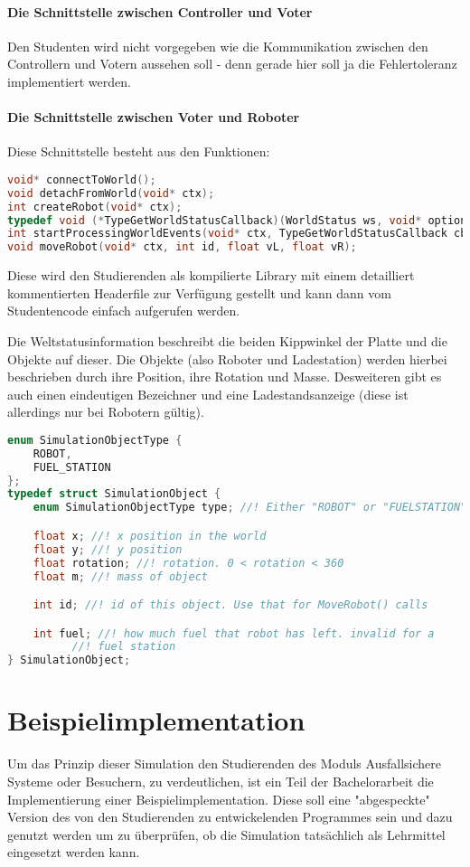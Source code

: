 \paragraph{Die Schnittstelle zwischen Controller und Voter} Den Studenten wird nicht vorgegeben wie die Kommunikation zwischen den Controllern und Votern aussehen soll - denn gerade hier soll ja die Fehlertoleranz implementiert werden.

\paragraph{Die Schnittstelle zwischen Voter und Roboter} Diese Schnittstelle besteht aus den Funktionen:
\begin{lstlisting}[frame=single, language=c] 
void* connectToWorld();
void detachFromWorld(void* ctx);
int createRobot(void* ctx);
typedef void (*TypeGetWorldStatusCallback)(WorldStatus ws, void* optional);
int startProcessingWorldEvents(void* ctx, TypeGetWorldStatusCallback cb, void* optional);
void moveRobot(void* ctx, int id, float vL, float vR);
\end{lstlisting}

Diese wird den Studierenden als kompilierte Library mit einem detailliert kommentierten Headerfile zur Verf{\"{u}}gung gestellt und kann
dann vom Studentencode einfach aufgerufen werden.

Die Weltstatusinformation beschreibt die beiden Kippwinkel der Platte und die Objekte auf dieser. Die Objekte (also Roboter und Ladestation) werden hierbei beschrieben
durch ihre Position, ihre Rotation und Masse. Desweiteren gibt es auch einen eindeutigen Bezeichner und eine Ladestandsanzeige (diese ist allerdings nur bei Robotern
g{\"{u}}ltig).
\label{worldstatus} 
\begin{lstlisting}[frame=single, language=c]
enum SimulationObjectType {
	ROBOT,
	FUEL_STATION
};
typedef struct SimulationObject {
	enum SimulationObjectType type; //! Either "ROBOT" or "FUELSTATION"

	float x; //! x position in the world
	float y; //! y position
	float rotation; //! rotation. 0 < rotation < 360
	float m; //! mass of object

	int id; //! id of this object. Use that for MoveRobot() calls

	int fuel; //! how much fuel that robot has left. invalid for a
		  //! fuel station
} SimulationObject;
\end{lstlisting}

\clearpage
\section{Beispielimplementation}
Um das Prinzip dieser Simulation den Studierenden des Moduls Ausfallsichere Systeme oder Besuchern, zu verdeutlichen, ist ein Teil der Bachelorarbeit die Implementierung einer
Beispielimplementation. Diese soll eine "abgespeckte" Version des von den Studierenden zu entwickelenden Programmes sein und dazu genutzt werden um zu {\"{u}}berpr{\"{u}}fen, ob die
Simulation tats{\"{a}}chlich als Lehrmittel eingesetzt werden kann.

